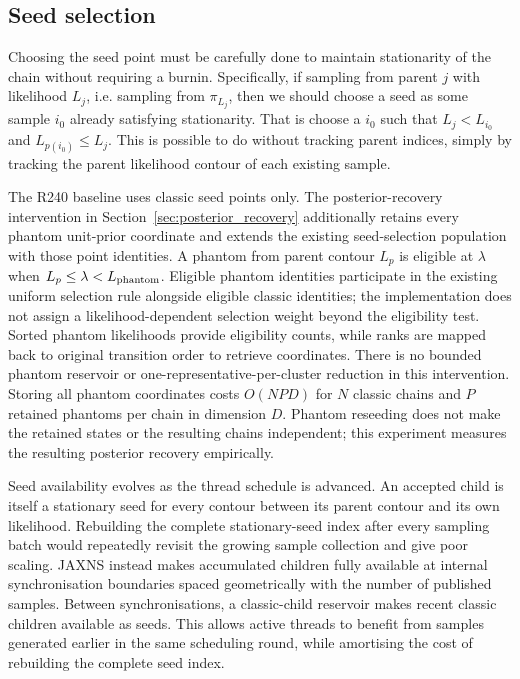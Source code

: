 \documentclass[pdflatex,sn-basic,icol]{sn-jnl}
\theoremstyle{plain}
\theoremstyle{definition}
\begin{document}
\subsection{Seed selection}

Choosing the seed point must be carefully done to maintain stationarity of the chain without requiring a burnin.
Specifically, if sampling from parent $j$ with likelihood $L_j$, i.e. sampling from $\pi_{L_j}$, then we should choose a seed as some sample $i_0$ already satisfying stationarity.
That is choose a $i_0$ such that $L_j < L_{i_0}$ and $L_{p(i_0)} \le L_j$.
This is possible to do without tracking parent indices, simply by tracking the parent likelihood contour of each existing sample.

The R240 baseline uses classic seed points only.
The posterior-recovery intervention in Section~\ref{sec:posterior_recovery} additionally retains every phantom unit-prior coordinate and extends the existing seed-selection population with those point identities.
A phantom from parent contour $L_p$ is eligible at $\lambda$ when $L_p\le\lambda<L_{\rm phantom}$.
Eligible phantom identities participate in the existing uniform selection rule alongside eligible classic identities; the implementation does not assign a likelihood-dependent selection weight beyond the eligibility test.
Sorted phantom likelihoods provide eligibility counts, while ranks are mapped back to original transition order to retrieve coordinates.
There is no bounded phantom reservoir or one-representative-per-cluster reduction in this intervention.
Storing all phantom coordinates costs $O(NPD)$ for $N$ classic chains and $P$ retained phantoms per chain in dimension $D$.
Phantom reseeding does not make the retained states or the resulting chains independent; this experiment measures the resulting posterior recovery empirically.

Seed availability evolves as the thread schedule is advanced.
An accepted child is itself a stationary seed for every contour between its parent contour and its own likelihood.
Rebuilding the complete stationary-seed index after every sampling batch would repeatedly revisit the growing sample collection and give poor scaling.
JAXNS instead makes accumulated children fully available at internal synchronisation boundaries spaced geometrically with the number of published samples.
Between synchronisations, a classic-child reservoir makes recent classic children available as seeds.
This allows active threads to benefit from samples generated earlier in the same scheduling round, while amortising the cost of rebuilding the complete seed index.
\end{document}
